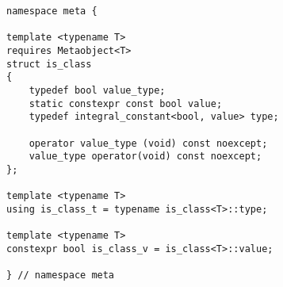 
\begin{verbatim}
namespace meta {

template <typename T>
requires Metaobject<T>
struct is_class
{
	typedef bool value_type;
	static constexpr const bool value;
	typedef integral_constant<bool, value> type;

	operator value_type (void) const noexcept;
	value_type operator(void) const noexcept;
};

template <typename T>
using is_class_t = typename is_class<T>::type;

template <typename T>
constexpr bool is_class_v = is_class<T>::value;

} // namespace meta
\end{verbatim}

